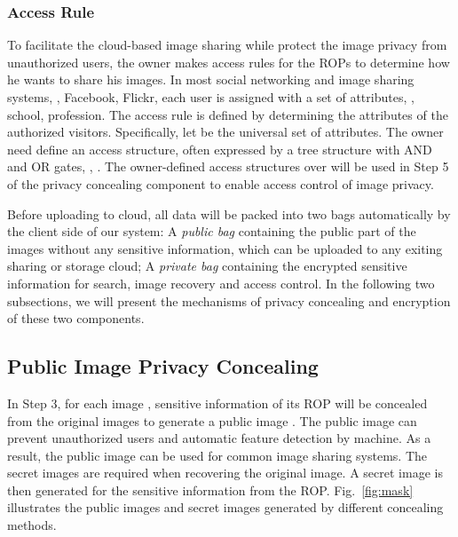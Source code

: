 {\subsubsection{Access Rule}

To facilitate the cloud-based image sharing
 while protect the image privacy from unauthorized users,
 the owner makes access rules for the ROPs to determine how he wants to share his images.
In most social networking and image sharing systems, \eg, Facebook, Flickr,
 each user is assigned with a set of attributes, \eg, school, profession.
The access rule is defined by determining the
 attributes of the authorized visitors.
Specifically, let  be the universal set of attributes.
The owner need  define an access structure, often expressed by a tree structure
 with AND and OR gates, \eg, \cite{bethencourt2007ciphertext}.
The owner-defined access structures over  will be used in
 Step {\large{\textcircled{\small{5}}}} of the privacy concealing component
 to enable access control of image privacy.

Before uploading to cloud,
 all data will be packed into two bags automatically by the client side of our system:
A \emph{public bag} containing the public part of the images without any sensitive information,
 which can be uploaded to any exiting sharing or storage cloud;
A \emph{private bag} containing the encrypted sensitive information
 for search, image recovery and access control.
In the following two subsections,
 we will present the mechanisms of privacy concealing and encryption
 of these two components.


\subsection{Public Image Privacy Concealing}
\label{sec:concealing}

In Step {\large{\textcircled{\small{3}}}}, for each image ,
 sensitive information of its ROP
 will be concealed from the original images to generate a public image .
The public image  can prevent unauthorized users
 and automatic feature detection by machine.
As a result, the public image can be used for common image sharing systems.
The secret images are required when recovering the original image.
A secret image  is then generated for
  the sensitive information from the ROP.
Fig.~\ref{fig:mask} illustrates the public images and secret images
 generated by different concealing methods.



}
